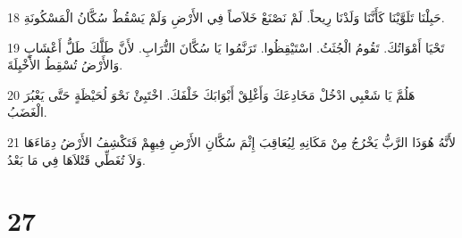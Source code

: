 \par 18 حَبِلْنَا تَلَوَّيْنَا كَأَنَّنَا وَلَدْنَا رِيحاً. لَمْ نَصْنَعْ خَلاَصاً فِي الأَرْضِ وَلَمْ يَسْقُطْ سُكَّانُ الْمَسْكُونَةِ.
\par 19 تَحْيَا أَمْوَاتُكَ. تَقُومُ الْجُثَثُ. اسْتَيْقِظُوا. تَرَنَّمُوا يَا سُكَّانَ التُّرَابِ. لأَنَّ طَلَّكَ طَلُّ أَعْشَابٍ وَالأَرْضُ تُسْقِطُ الأَخْيِلَةَ.
\par 20 هَلُمَّ يَا شَعْبِي ادْخُلْ مَخَادِعَكَ وَأَغْلِقْ أَبْوَابَكَ خَلْفَكَ. اخْتَبِئْ نَحْوَ لُحَيْظَةٍ حَتَّى يَعْبُرَ الْغَضَبُ.
\par 21 لأَنَّهُ هُوَذَا الرَّبُّ يَخْرُجُ مِنْ مَكَانِهِ لِيُعَاقِبَ إِثْمَ سُكَّانِ الأَرْضِ فِيهِمْ فَتَكْشِفُ الأَرْضُ دِمَاءَهَا وَلاَ تُغَطِّي قَتْلاَهَا فِي مَا بَعْدُ.

\chapter{27}


